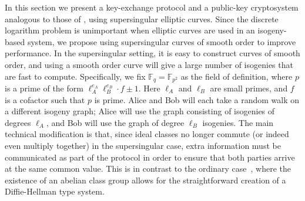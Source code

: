 \documentclass[envcountsect,envcountsame,runningheads]{llncs}   %
\newcommand{\FF}{{\mathbb{F}}}
\begin{document}
In this section we present a key-exchange protocol and a public-key
cryptosystem analogous to those of \cite{R&S,Stol}, using
supersingular elliptic curves.  Since the discrete logarithm problem
is unimportant when elliptic curves are used in an isogeny-based
system, we propose using supersingular curves of smooth order to
improve performance. In the supersingular setting, it is easy to
construct curves of smooth order, and using a smooth order curve will
give a large number of isogenies that are fast to
compute. Specifically, we fix $\FF_q = \FF_{p^2}$ as the field of
definition, where $p$ is a prime of the form $\ell_A^{e_A}
\ell_B^{e_B}\cdot f \pm 1$.  Here $\ell_A$ and $\ell_B$ are small
primes, and $f$ is a cofactor such that $p$ is prime. Alice and Bob
will each take a random walk on a different isogeny graph; Alice will
use the graph consisting of isogenies of degrees $\ell_A$, and Bob
will use the graph of degree $\ell_B$ isogenies. The main technical
modification is that, since ideal classes no longer commute (or indeed
even multiply together) in the supersingular case, extra information
must be communicated as part of the protocol in order to ensure that
both parties arrive at the same common value. This is in contrast to
the ordinary case~\cite{Stol}, where the existence of an abelian class
group allows for the straightforward creation of a Diffie-Hellman type
system.
\end{document}
